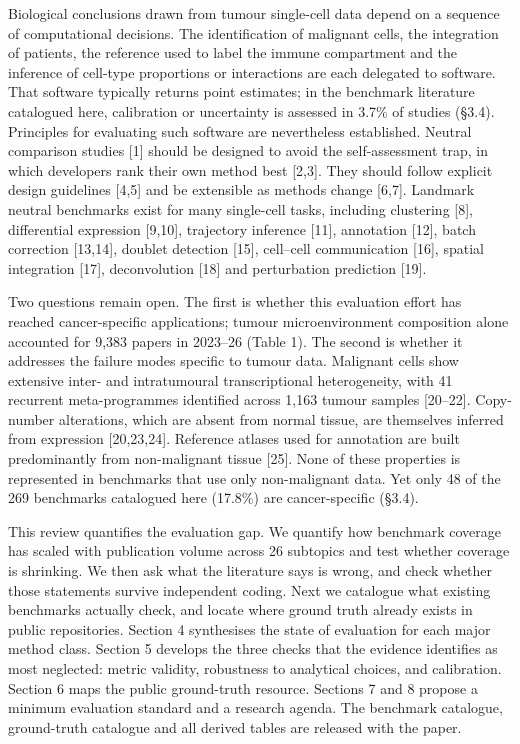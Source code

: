 \documentclass[11pt]{article}
\begin{document}
Biological conclusions drawn from tumour single-cell data depend on a
sequence of computational decisions. The identification of malignant
cells, the integration of patients, the reference used to label the
immune compartment and the inference of cell-type proportions or
interactions are each delegated to software. That software typically
returns point estimates; in the benchmark literature catalogued here,
calibration or uncertainty is assessed in 3.7\% of studies (§3.4).
Principles for evaluating such software are nevertheless established.
Neutral comparison studies {[}1{]} should be designed to avoid the
self-assessment trap, in which developers rank their own method best
{[}2,3{]}. They should follow explicit design guidelines {[}4,5{]} and
be extensible as methods change {[}6,7{]}. Landmark neutral benchmarks
exist for many single-cell tasks, including clustering {[}8{]},
differential expression {[}9,10{]}, trajectory inference {[}11{]},
annotation {[}12{]}, batch correction {[}13,14{]}, doublet detection
{[}15{]}, cell--cell communication {[}16{]}, spatial integration
{[}17{]}, deconvolution {[}18{]} and perturbation prediction {[}19{]}.

Two questions remain open. The first is whether this evaluation effort
has reached cancer-specific applications; tumour microenvironment
composition alone accounted for 9,383 papers in 2023--26 (Table 1). The
second is whether it addresses the failure modes specific to tumour
data. Malignant cells show extensive inter- and intratumoural
transcriptional heterogeneity, with 41 recurrent meta-programmes
identified across 1,163 tumour samples {[}20--22{]}. Copy-number
alterations, which are absent from normal tissue, are themselves
inferred from expression {[}20,23,24{]}. Reference atlases used for
annotation are built predominantly from non-malignant tissue {[}25{]}.
None of these properties is represented in benchmarks that use only
non-malignant data. Yet only 48 of the 269 benchmarks catalogued here
(17.8\%) are cancer-specific (§3.4).

This review quantifies the evaluation gap. We quantify how benchmark
coverage has scaled with publication volume across 26 subtopics and test
whether coverage is shrinking. We then ask what the literature says is
wrong, and check whether those statements survive independent coding.
Next we catalogue what existing benchmarks actually check, and locate
where ground truth already exists in public repositories. Section 4
synthesises the state of evaluation for each major method class. Section
5 develops the three checks that the evidence identifies as most
neglected: metric validity, robustness to analytical choices, and
calibration. Section 6 maps the public ground-truth resource. Sections 7
and 8 propose a minimum evaluation standard and a research agenda. The
benchmark catalogue, ground-truth catalogue and all derived tables are
released with the paper.
\end{document}
